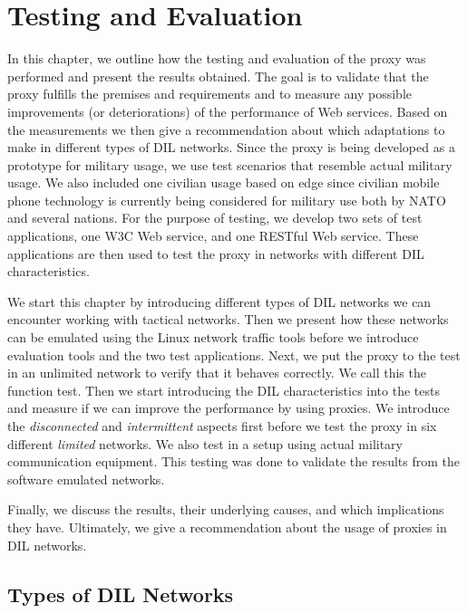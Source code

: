 \chapter{Testing and Evaluation}

\label{chapter:evaluation}

In this chapter, we outline how the testing and evaluation of the proxy was
performed and present the results obtained. The goal is to validate that the
proxy fulfills the premises and requirements and to measure any possible
improvements (or deteriorations) of the performance of Web services. Based on
the measurements we then give a recommendation about which adaptations to make
in different types of DIL networks. Since the proxy is being developed as a
prototype for military usage, we use test scenarios that resemble actual
military usage. We also included one civilian usage based on \gls{edge} since
civilian mobile phone technology is currently being considered for military use
both by NATO and several nations. For the purpose of testing, we develop two
sets of test applications, one W3C Web service, and one RESTful Web service.
These applications are then used to test the proxy in networks with different
DIL characteristics.

We start this chapter by introducing different types of DIL networks we can
encounter working with tactical networks. Then we present how these networks can
be emulated using the Linux network traffic tools before we introduce evaluation
tools and the two test applications. Next, we put the proxy to the test in an
unlimited network to verify that it behaves correctly. We call this the function
test. Then we start introducing the DIL characteristics into the tests and
measure if we can improve the performance by using proxies. We introduce the
\textit{disconnected} and \textit{intermittent} aspects first before we test the
proxy in six different \textit{limited} networks. We also test in a setup using
actual military communication equipment. This testing was done to validate the
results from the software emulated networks.

Finally, we discuss the results, their underlying causes, and which implications
they have. Ultimately, we give a recommendation about the usage of proxies in
DIL networks.

\section{Types of DIL Networks}

